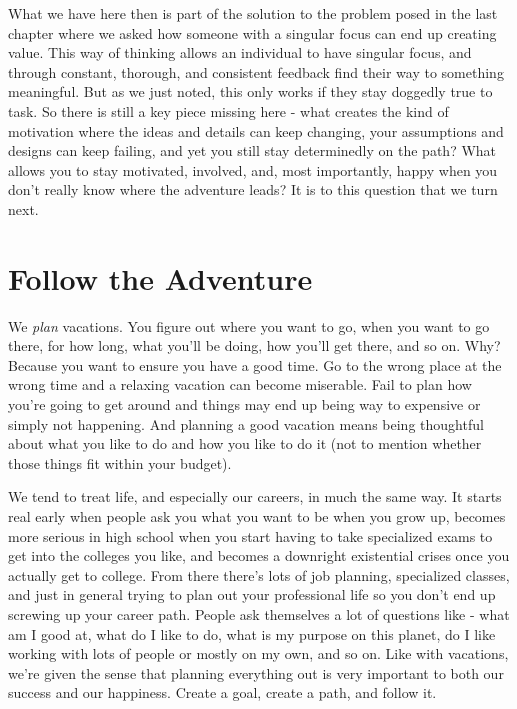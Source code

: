 \documentclass[11pt,a5paper]{book}
\begin{document}
What we have here then is part of the solution to the problem posed in the last chapter where we asked how someone with a singular focus can end up creating value. This way of thinking allows an individual to have singular focus, and through constant, thorough, and consistent feedback find their way to something meaningful. But as we just noted, this only works if they stay doggedly true to task. So there is still a key piece missing here - what creates the kind of motivation where the ideas and details can keep changing, your assumptions and designs can keep failing, and yet you still stay determinedly on the path? What allows you to stay motivated, involved, and, most importantly, happy when you don't really know where the adventure leads? It is to this question that we turn next.

\chapter{Follow the Adventure}
We \textit{plan} vacations. You figure out where you want to go, when you want to go there, for how long, what you'll be doing, how you'll get there, and so on. Why? Because you want to ensure you have a good time. Go to the wrong place at the wrong time and a relaxing vacation can become miserable. Fail to plan how you're going to get around and things may end up being way to expensive or simply not happening. And planning a good vacation means being thoughtful about what you like to do and how you like to do it (not to mention whether those things fit within your budget). 
\newline

We tend to treat life, and especially our careers, in much the same way. It starts real early when people ask you what you want to be when you grow up, becomes more serious in high school when you start having to take specialized exams to get into the colleges you like, and becomes a downright existential crises once you actually get to college. From there there's lots of job planning, specialized classes, and just in general trying to plan out your professional life so you don't end up screwing up your career path. People ask themselves a lot of questions like - what am I good at, what do I like to do, what is my purpose on this planet, do I like working with lots of people or mostly on my own, and so on. Like with vacations, we're given the sense that planning everything out is very important to both our success and our happiness. Create a goal, create a path, and follow it.
\newline
\end{document}
